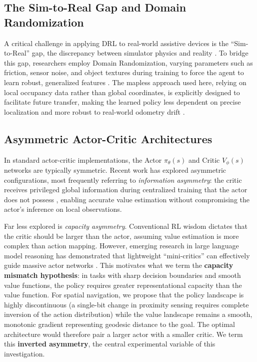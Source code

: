 \documentclass{article}
\begin{document}
\subsection{The Sim-to-Real Gap and Domain Randomization}

A critical challenge in applying DRL to real-world assistive devices is the
``Sim-to-Real'' gap, the discrepancy between simulator physics and reality
\cite{choi2020}. To bridge this gap, researchers employ Domain Randomization,
varying parameters such as friction, sensor noise, and object textures during
training to force the agent to learn robust, generalized features
\cite{anderson2020}. The mapless approach used here, relying on local occupancy
data rather than global coordinates, is explicitly designed to facilitate future
transfer, making the learned policy less dependent on precise localization and
more robust to real-world odometry drift \cite{tsai2024}.

\subsection{Asymmetric Actor-Critic Architectures}

In standard actor-critic implementations, the Actor $\pi_\theta(s)$ and Critic
$V_\phi(s)$ networks are typically symmetric. Recent work has explored asymmetric
configurations, most frequently referring to \emph{information asymmetry}: the
critic receives privileged global information during centralized training that the
actor does not possess \cite{ebi2025,wang2024}, enabling accurate value estimation
without compromising the actor's inference on local observations.

Far less explored is \emph{capacity asymmetry}. Conventional RL wisdom dictates
that the critic should be larger than the actor, assuming value estimation is more
complex than action mapping. However, emerging research in large language model
reasoning has demonstrated that lightweight ``mini-critics'' can effectively guide
massive actor networks \cite{liu2025}. This motivates what we term the
\textbf{capacity mismatch hypothesis}: in tasks with sharp decision boundaries
and smooth value functions, the policy requires greater representational capacity
than the value function. For spatial navigation, we propose that the policy
landscape is highly discontinuous (a single-bit change in proximity sensing
requires complete inversion of the action distribution) while the value landscape
remains a smooth, monotonic gradient representing geodesic distance to the goal.
The optimal architecture would therefore pair a larger actor with a smaller
critic. We term this \textbf{inverted asymmetry}, the central experimental
variable of this investigation.
\end{document}
